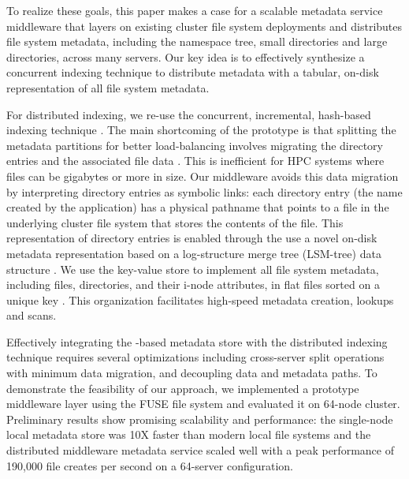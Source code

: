  
To realize these goals, this paper makes a case for a scalable metadata service 
middleware that layers on existing cluster file system deployments and 
distributes file system metadata, including the namespace tree, small 
directories and large directories, across many servers.
Our key idea is to effectively synthesize a concurrent indexing 
technique to distribute metadata with a tabular, on-disk representation of all
file system metadata. 

For distributed indexing, we re-use the concurrent, incremental, hash-based
\giga{} indexing technique \cite{GIGA11}.
The main shortcoming of the \giga{} prototype is that splitting
the metadata partitions for better load-balancing involves migrating the
directory entries and the associated file data \cite{GIGA11}.
This is inefficient for HPC systems where files can be gigabytes or more in
size. Our middleware avoids this data migration by interpreting directory 
entries as symbolic links: each directory entry (the name created by the
application) has a physical pathname that points to a file in the underlying
cluster file system that stores the contents of the file.
This representation of directory entries is enabled through the use a novel
on-disk metadata representation based on a log-structure merge tree (LSM-tree)
data structure \cite{ONeil1996}.
We use the \ldb{} key-value store to implement all file system metadata, including 
files, directories, and their i-node attributes, in flat files sorted on a
unique key \cite{LevelDB}.
This organization facilitates high-speed metadata creation, lookups and scans.

Effectively integrating the \ldb-based metadata store with the distributed indexing
technique requires several optimizations including cross-server split operations 
with minimum data migration, and decoupling data and metadata paths.
To demonstrate the feasibility of our approach, we implemented a prototype middleware layer
using the FUSE file system and evaluated it on 64-node cluster. Preliminary
results show promising scalability and performance: the single-node local metadata 
store was 10X faster than modern local file systems and the distributed
middleware metadata service scaled well with a peak performance of 190,000 file creates per second 
on a 64-server configuration. 


